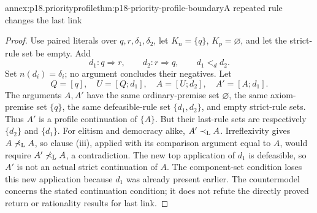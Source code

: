 \begin{annexitem}{annex:p18.priorityprofile}{thm:p18-priority-profile-boundary}{A repeated rule changes the last link}
\begin{proof}
Use paired literals over \(q,r,\delta_1,\delta_2\), let \(K_n=\{q\}\), \(K_p=\varnothing\),
and let the strict-rule set be empty. Add
\[
 d_1:q\Rightarrow r,\qquad d_2:r\Rightarrow q,
 \qquad d_1<_d d_2.
 \tag{10}
\]
Set \(n(d_i)=\delta_i\); no argument concludes their negatives.
Let
\[
 Q=[q],\quad U=[Q;d_1],\quad A=[U;d_2],\quad A'=[A;d_1].
 \]
The arguments \(A,A'\) have the same ordinary-premise set
\(\varnothing\), the same axiom-premise set \(\{q\}\), the same
defeasible-rule set \(\{d_1,d_2\}\), and empty strict-rule sets.
Thus \(A'\) is a profile continuation of \(\{A\}\).
But their last-rule sets are respectively \(\{d_2\}\) and \(\{d_1\}\).
For elitism and democracy alike, \(A'\prec_{\rm L}A\).
Irreflexivity gives \(A\not\prec_{\rm L}A\), so clause (iii), applied
with its comparison argument equal to \(A\), would require
\(A'\not\prec_{\rm L}A\), a contradiction.
The new top application of \(d_1\) is defeasible, so \(A'\) is not
an actual strict continuation of \(A\).
The component-set condition loses this new application because \(d_1\)
was already present earlier. The countermodel concerns the stated
continuation condition; it does not refute the directly proved return
or rationality results for last link.
\end{proof}
\end{annexitem}

